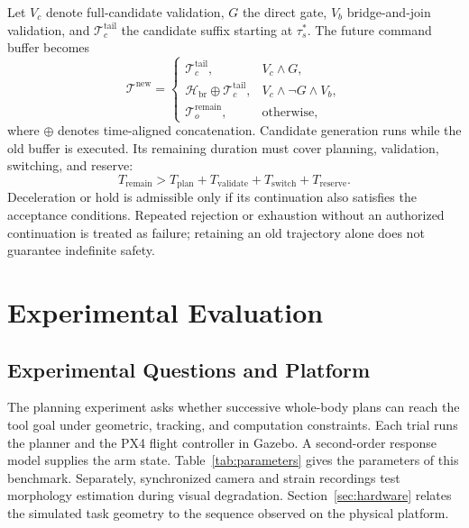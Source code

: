 \documentclass[journal,twoside]{IEEEtran}
\begin{document}
Let $V_c$ denote full-candidate validation, $G$ the direct gate, $V_b$ bridge-and-join validation, and $\mathcal T_c^{\mathrm{tail}}$ the candidate suffix starting at $\tau_s^*$. The future command buffer becomes
\begin{equation}
\mathcal T^{\mathrm{new}}=
\begin{cases}
\mathcal T_c^{\mathrm{tail}},&V_c\land G,\\
\mathcal H_{\mathrm{br}}\oplus\mathcal T_c^{\mathrm{tail}},&V_c\land\neg G\land V_b,\\
\mathcal T_o^{\mathrm{remain}},&\text{otherwise},
\end{cases}
\label{eq:cache}
\end{equation}
where $\oplus$ denotes time-aligned concatenation. Candidate generation runs while the old buffer is executed. Its remaining duration must cover planning, validation, switching, and reserve:
\begin{equation}
T_{\mathrm{remain}}>T_{\mathrm{plan}}+T_{\mathrm{validate}}
+T_{\mathrm{switch}}+T_{\mathrm{reserve}}.
\label{eq:buffer}
\end{equation}
Deceleration or hold is admissible only if its continuation also satisfies the acceptance conditions. Repeated rejection or exhaustion without an authorized continuation is treated as failure; retaining an old trajectory alone does not guarantee indefinite safety.

\section{Experimental Evaluation}\label{sec:experiments}
\subsection{Experimental Questions and Platform}
The planning experiment asks whether successive whole-body plans can reach the tool goal under geometric, tracking, and computation constraints. Each trial runs the planner and the PX4 flight controller in Gazebo. A second-order response model supplies the arm state. Table~\ref{tab:parameters} gives the parameters of this benchmark. Separately, synchronized camera and strain recordings test morphology estimation during visual degradation. Section~\ref{sec:hardware} relates the simulated task geometry to the sequence observed on the physical platform.
\end{document}
